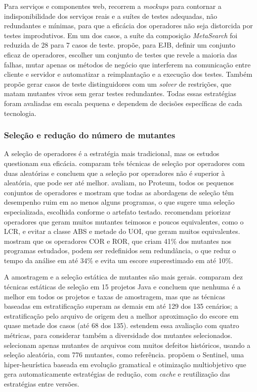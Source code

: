 Para serviços e componentes web,  recorrem a \textit{mockups} para contornar a indisponibilidade dos serviços reais e a suítes de testes adequadas, não redundantes e mínimas, para que a eficácia dos operadores não seja distorcida por testes improdutivos. Em um dos casos, a suíte da composição \textit{MetaSearch} foi reduzida de 28 para 7 casos de teste.  propõe, para EJB, definir um conjunto eficaz de operadores, escolher um conjunto de testes que revele a maioria das falhas, mutar apenas os métodos de negócio que interferem na comunicação entre cliente e servidor e automatizar a reimplantação e a execução dos testes. Também propõe gerar casos de teste distinguidores com um \textit{solver} de restrições, que matam mutantes vivos sem gerar testes redundantes. Todas essas estratégias foram avaliadas em escala pequena e dependem de decisões específicas de cada tecnologia.

\subsubsection{Seleção e redução do número de mutantes}
\label{subsubsec:selecao-reducao}

A seleção de operadores é a estratégia mais tradicional, mas os estudos questionam sua eficácia.  comparam três técnicas de seleção por operadores com duas aleatórias e concluem que a seleção por operadores não é superior à aleatória, que pode ser até melhor.  avaliam, no Proteum, todos os pequenos conjuntos de operadores e mostram que todas as abordagens de seleção têm desempenho ruim em ao menos alguns programas, o que sugere uma seleção especializada, escolhida conforme o artefato testado.  recomendam priorizar operadores que geram muitos mutantes teimosos e poucos equivalentes, como o LCR, e evitar a classe ABS e metade do UOI, que geram muitos equivalentes.  mostram que os operadores COR e ROR, que criam 41\% dos mutantes nos programas estudados, podem ser redefinidos sem redundância, o que reduz o tempo da análise em até 34\% e evita um escore superestimado em até 10\%.

A amostragem e a seleção estática de mutantes são mais gerais.  comparam dez técnicas estáticas de seleção em 15 projetos Java e concluem que nenhuma é a melhor em todos os projetos e taxas de amostragem, mas que as técnicas baseadas em estratificação superam as demais em até 129 dos 135 cenários; a estratificação pelo arquivo de origem deu a melhor aproximação do escore em quase metade dos casos (até 68 dos 135).  estendem essa avaliação com quatro métricas, para considerar também a diversidade dos mutantes selecionados.  selecionam apenas mutantes de arquivos com muitos defeitos históricos, usando a seleção aleatória, com 776 mutantes, como referência.  propõem o Sentinel, uma hiper-heurística baseada em evolução gramatical e otimização multiobjetivo que gera automaticamente estratégias de redução, com \textit{cache} e reutilização das estratégias entre versões.

